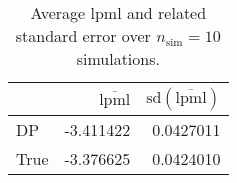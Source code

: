 \begin{table}[H]

\caption{Average lpml and related standard error over $n_{\text{sim}} = 10$ simulations.}
\centering
\begin{tabular}[t]{lrr}
\toprule
  & $\overbar{\text{lpml}}$ & $\text{sd}(\overbar{\text{lpml}})$\\
\midrule
DP & -3.411422 & 0.0427011\\
True & -3.376625 & 0.0424010\\
\bottomrule
\end{tabular}
\end{table}